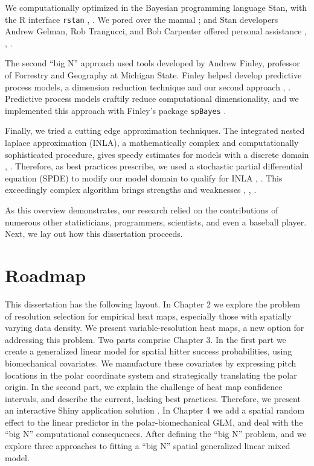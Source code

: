 We computationally optimized in the Bayesian programming language Stan, with the R interface \verb|rstan| \citep{rstan}, \citep{Gelman2015}. We pored over the manual \citep{STANtheMan}; and Stan developers Andrew Gelman, Rob Trangucci, and Bob Carpenter offered personal assistance \citep{Gelman}, \citep{Trangucci}, \citep{Carpenter}.

The second ``big N'' approach used tools developed by Andrew Finley, professor of Forrestry and Geography at Michigan State. Finley helped develop predictive process models, a dimension reduction technique and our second approach \citep{Banerjee2008}, \citep{Finley2012}. Predictive process models craftily reduce computational dimensionality, and we implemented this approach with Finley's package \verb|spBayes| \citep{Finley2013}.

Finally, we tried a cutting edge approximation techniques. The integrated nested laplace approximation (INLA), a mathematically complex and computationally sophisticated procedure, gives speedy estimates for models with a discrete domain \citep{Rue2009}, \citep{Rue2005}. Therefore, as best practices prescribe, we used a stochastic partial differential equation (SPDE) to modify our model domain to qualify for INLA \citep{Lindgren2011}, \citep{Lindstrom2016}. This exceedingly complex algorithm brings strengths and weaknesses \citep{Mondal2017}, \citep{Simpson2012b}, \citep{Rue2009}.

As this overview demonstrates, our research relied on the contributions of numerous other statisticians, programmers, scientists, and even a baseball player. Next, we lay out how this dissertation proceeds.

\section{Roadmap}

This dissertation has the following layout. In Chapter 2 we explore the problem of resolution selection for empirical heat maps, especially those with spatially varying data density. We present variable-resolution heat maps, a new option for addressing this problem. Two parts comprise Chapter 3. In the first part we create a generalized linear model for spatial hitter success probabilities, using biomechanical covariates. We manufacture these covariates by expressing pitch locations in the polar coordinate system and strategically translating the polar origin. In the second part, we explain the challenge of heat map confidence intervals, and describe the current, lacking best practices. Therefore, we present an interactive Shiny application solution \citep{Shiny}. In Chapter 4 we add a spatial random effect to the linear predictor in the polar-biomechanical GLM, and deal with the ``big N'' computational consequences. After defining the ``big N'' problem, and we explore three approaches to fitting a ``big N'' spatial generalized linear mixed model. 
